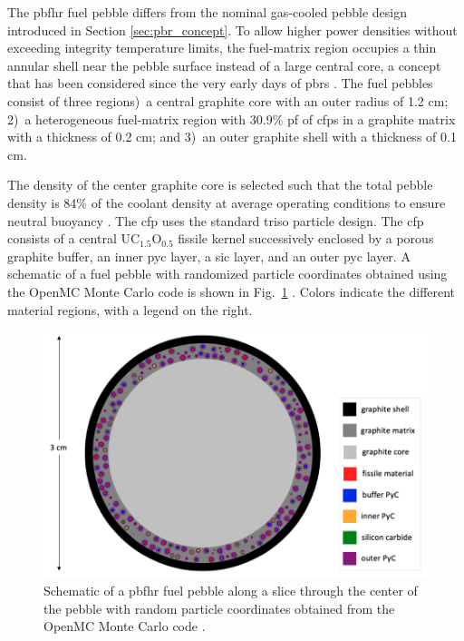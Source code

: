 The \gls{pbfhr} fuel pebble differs from the nominal gas-cooled pebble design introduced in Section \ref{sec:pbr_concept}. To allow higher power densities without exceeding integrity temperature limits, the fuel-matrix region occupies a thin annular shell near the pebble surface instead of a large central core, a concept that has been considered since the very early days of \glspl{pbr} \cite{claxton}. The fuel pebbles consist of three regions)~a central graphite core with an outer radius of 1.2 \si{\centi\meter}; 2)~a heterogeneous fuel-matrix region with 30.9\% \gls{pf} of \glspl{cfp} in a graphite matrix with a thickness of 0.2 \si{\centi\meter}; and 3)~an outer graphite shell with a thickness of 0.1 \si{\centi\meter}. 

The density of the center graphite core is selected such that the total pebble density is 84\% of the coolant density at average operating conditions to ensure neutral buoyancy \cite{fratoni}. The \gls{cfp} uses the standard \gls{triso} particle design. The \gls{cfp} consists of a central UC$_{1.5}$O$_{0.5}$ fissile kernel successively enclosed by a porous graphite buffer, an inner \gls{pyc} layer, a \gls{sic} layer, and an outer \gls{pyc} layer. A schematic of a fuel pebble with randomized particle coordinates obtained using the OpenMC Monte Carlo code is shown in Fig.\ \ref{fig:pbfhr_fuel} \cite{romano}. Colors indicate the different material regions, with a legend on the right.

\begin{figure}[h!]
\centering
\hspace{1.5cm}
\includegraphics[width=0.6\linewidth]{figs/pbfhr_pebble.png}
\caption{Schematic of a \gls{pbfhr} fuel pebble along a slice through the center of the pebble with random particle coordinates obtained from the OpenMC Monte Carlo code \cite{romano}.}
\label{fig:pbfhr_fuel}
\end{figure}

